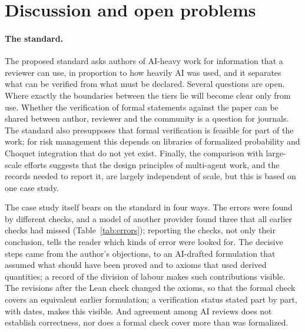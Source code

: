 \section{Discussion and open problems}\label{sec:discussion}

\paragraph{The standard.}
The proposed standard asks authors of AI-heavy work for information that a reviewer can use, in proportion to how
heavily AI was used, and it separates what can be verified from what must be declared. Several questions are open.
Where exactly the boundaries between the tiers lie will become clear only from use. Whether the verification of
formal statements against the paper can be shared between author, reviewer and the community is a question for
journals. The standard also presupposes that formal verification is feasible for
part of the work; for risk management this depends on libraries of formalized probability and Choquet integration
that do not yet exist. Finally, the comparison with large-scale efforts suggests that the design principles of
multi-agent work, and the records needed to report it, are largely independent of scale, but this is based on one
case study.

The case study itself bears on the standard in four ways. The errors were found by different checks, and a model of
another provider found three that all earlier checks had missed (Table~\ref{tab:errors}); reporting the checks, not
only their conclusion, tells the reader which kinds of error were looked for. The decisive steps came from the
author's objections, to an AI-drafted formulation that assumed what should have been proved and to axioms that used
derived quantities; a record of the division of labour makes such contributions visible. The revisions after the
Lean check changed the axioms, so that the formal check covers an equivalent earlier formulation; a verification
status stated part by part, with dates, makes this visible. And agreement among AI reviews does not establish
correctness, nor does a formal check cover more than was formalized.

